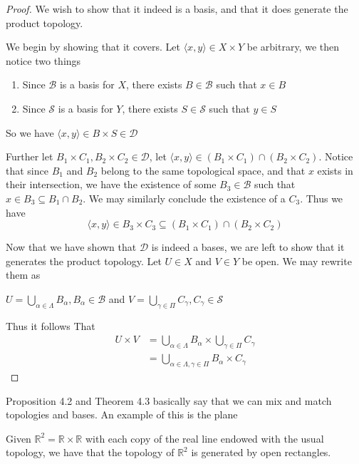 \begin{proof}
    We wish to show that it indeed is a basis, and that it does generate the product topology.

    We begin by showing that it covers. Let $\langle x,y\rangle\in X\times Y$ be arbitrary, we then notice two things
    \begin{enumerate}
        \item Since $\mathscr{B}$ is a basis for $X$, there exists $B\in\mathscr{B}$ such that $x\in B$
        \item Since $\mathscr{S}$ is a basis for $Y$, there exists $S\in\mathscr{S}$ such that $y\in S$
    \end{enumerate}
    So we have $\langle x,y\rangle\in B\times S\in\mathscr{D}$

    Further let $B_1\times C_1,B_2\times C_2\in\mathscr{D}$, let $\langle x,y\rangle\in(B_1\times C_1)\cap(B_2\times C_2)$. Notice that since $B_1$ and $B_2$ belong to the same topological space, and that $x$ exists in their intersection, we have the existence of some $B_3\in\mathscr{B}$ such that $x\in B_3\subseteq B_1\cap B_2$. We may similarly conclude the existence of a $C_3$. Thus we have
    \[\langle x,y\rangle\in B_3\times C_3\subseteq (B_1\times C_1)\cap(B_2\times C_2)\]

    Now that we have shown that $\mathscr{D}$ is indeed a bases, we are left to show that it generates the product topology. Let $U\in X$ and $V\in Y$ be open. We may rewrite them as
    \begin{center}
        $U = \bigcup_{\alpha\in\Lambda}B_\alpha, B_\alpha\in\mathscr{B}$ and $V = \bigcup_{\gamma\in\Pi}C_\gamma, C_\gamma\in\mathscr{S}$

    \end{center}
    Thus it follows That
    \begin{align*}
        U\times V &= \bigcup_{\alpha\in\Lambda}B_\alpha\times \bigcup_{\gamma\in\Pi}C_\gamma\\
        &= \bigcup_{\alpha\in\Lambda,\gamma\in\Pi}B_\alpha\times C_\gamma
    \end{align*}
\end{proof}
Proposition 4.2 and Theorem 4.3 basically say that we can mix and match topologies and bases. An example of this is the plane
\begin{example}
    Given $\mathbb{R}^2=\mathbb{R}\times\mathbb{R}$ with each copy of the real line endowed with the usual topology, we have that the topology of $\mathbb{R}^2$ is generated by open rectangles.
\end{example}
